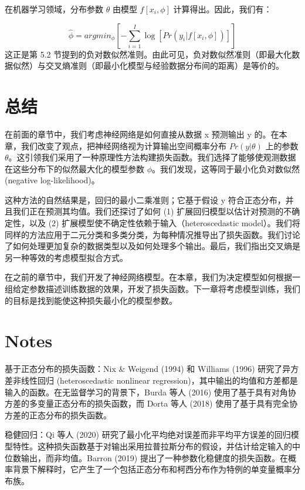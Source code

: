 在机器学习领域，分布参数 \(\theta\) 由模型 \(f[x_i, \phi]\) 计算得出。因此，我们有：

\begin{equation}
\hat{\phi} = argmin_{\phi} \left[ -\sum_{i=1}^{I} \log [Pr(y_i|f[x_i, \phi])] \right] 
\end{equation}
这正是第 5.2 节提到的负对数似然准则。由此可见，负对数似然准则（即最大化数据似然）与交叉熵准则（即最小化模型与经验数据分布间的距离）是等价的。

\section{总结}

在前面的章节中，我们考虑神经网络是如何直接从数据 x 预测输出 y 的。在本章，我们改变了观点，把神经网络视为计算输出空间概率分布 \(Pr(y|\theta)\) 上的参数 \(\theta\)。这引领我们采用了一种原理性方法构建损失函数。我们选择了能够使观测数据在这些分布下的似然最大化的模型参数 \(\phi\)。我们发现，这等同于最小化负对数似然 (negative log-likelihood)。

这种方法的自然结果是，回归的最小二乘准则；它基于假设 y 符合正态分布，并且我们正在预测其均值。我们还探讨了如何 (1) 扩展回归模型以估计对预测的不确定性，以及 (2) 扩展模型使不确定性依赖于输入（heteroscedastic model）。我们将同样的方法应用于二元分类和多类分类，为每种情况推导出了损失函数。我们讨论了如何处理更加复杂的数据类型以及如何处理多个输出。最后，我们指出交叉熵是另一种等效的考虑模型拟合方式。

在之前的章节中，我们开发了神经网络模型。在本章，我们为决定模型如何根据一组给定参数描述训练数据的效果，开发了损失函数。下一章将考虑模型训练，我们的目标是找到能使这种损失最小化的模型参数。


\section{Notes}

基于正态分布的损失函数：Nix \& Weigend (1994) 和 Williams (1996) 研究了异方差非线性回归 (heteroscedastic nonlinear regression)，其中输出的均值和方差都是输入的函数。在无监督学习的背景下，Burda 等人 (2016) 使用了基于具有对角协方差的多变量正态分布的损失函数，而 Dorta 等人 (2018) 使用了基于具有完全协方差的正态分布的损失函数。

稳健回归：Qi 等人 (2020) 研究了最小化平均绝对误差而非平均平方误差的回归模型特性。这种损失函数基于对输出采用拉普拉斯分布的假设，并估计给定输入的中位数输出，而非均值。Barron (2019) 提出了一种参数化稳健度的损失函数。在概率背景下解释时，它产生了一个包括正态分布和柯西分布作为特例的单变量概率分布族。

